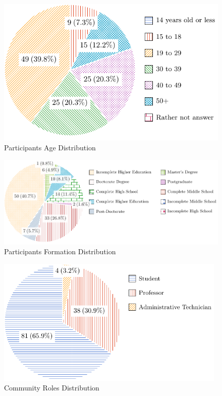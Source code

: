 \begin{figure}[!htb]
  \caption{Participants Age Distribution}\label{fig:age-distribution}
  \begin{center}
    \includegraphics[width=.6\textwidth]{img/5-participants-age.pdf}
  \end{center}
\end{figure}

\begin{figure}[!htb]
  \caption{Participants Formation Distribution}\label{fig:formation-distribution}
  \begin{center}
    \includegraphics[width=\textwidth]{img/5-participants-formation.pdf}
  \end{center}
\end{figure}

\begin{figure}[!htb]
  \caption{Community Roles Distribution}\label{fig:community-roles}
  \begin{center}
    \includegraphics[width=11cm]{img/5-community-roles.pdf}
  \end{center}
\end{figure}

